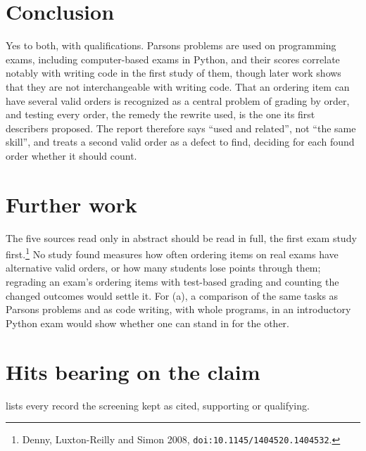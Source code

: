 \section{Conclusion}
\label{sec:parsons-conclusion}

Yes to both, with qualifications.  Parsons problems are used on
programming exams, including computer-based exams in Python, and their
scores correlate notably with writing code in the first study of them,
though later work shows that they are not interchangeable with writing
code.  That an ordering item can have several valid orders is recognized
as a central problem of grading by order, and testing every order, the
remedy the rewrite used, is the one its first describers proposed.  The
report therefore says \enquote{used and related}, not \enquote{the same
skill}, and treats a second valid order as a defect to find, deciding for
each found order whether it should count.

\section{Further work}
\label{sec:parsons-further}

The five sources read only in abstract should be read in full, the first
exam study first.\footnote{Denny, Luxton-Reilly and Simon 2008,
\texttt{doi:10.1145/1404520.1404532}.}  No study found measures how often
ordering items on real exams have alternative valid orders, or how many
students lose points through them; regrading an exam's ordering items with
test-based grading and counting the changed outcomes would settle it.  For
(a), a comparison of the same tasks as Parsons problems and as code
writing, with whole programs, in an introductory Python exam would show
whether one can stand in for the other.

\section{Hits bearing on the claim}
\label{sec:parsons-hits}

 lists every record the screening kept as cited,
supporting or qualifying.



